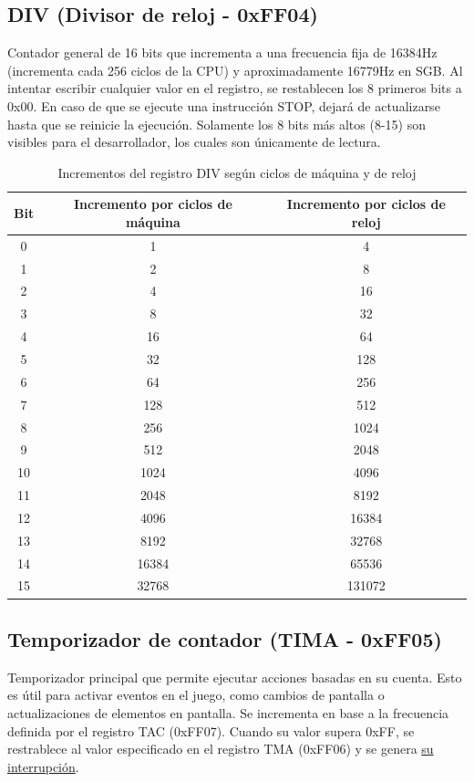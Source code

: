 \subsection{DIV (Divisor de reloj - 0xFF04)}
Contador general de 16 bits que incrementa a una frecuencia fija de 16384Hz (incrementa cada 256 ciclos de la CPU) y aproximadamente 16779Hz en SGB. Al intentar escribir cualquier valor en el registro, se restablecen los 8 primeros bits a 0x00. En caso de que se ejecute una instrucción STOP, dejará de actualizarse hasta que se reinicie la ejecución. Solamente los 8 bits más altos (8-15) son visibles para el desarrollador, los cuales son únicamente de lectura.
\begin{table}[H]
    \centering
    \begin{tabular}{|c|c|c|}
    \hline
    \textbf{Bit} & \textbf{Incremento por ciclos de máquina} & \textbf{Incremento por ciclos de reloj} \\ \hline
    0  & 1 & 4 \\ \hline
    1  & 2 & 8 \\ \hline
    2  & 4 & 16 \\ \hline
    3  & 8  & 32 \\ \hline
    4  & 16 & 64 \\ \hline
    5  & 32 & 128 \\ \hline
    6  & 64 & 256 \\ \hline
    7  & 128 & 512 \\ \hline
    8  & 256 & 1024 \\ \hline
    9  & 512 & 2048 \\ \hline
    10 & 1024 & 4096 \\ \hline
    11 & 2048 & 8192 \\ \hline
    12 & 4096 & 16384 \\ \hline
    13 & 8192 & 32768 \\ \hline
    14 & 16384 & 65536 \\ \hline
    15 & 32768 & 131072 \\ \hline
    \end{tabular}
    \caption{Incrementos del registro DIV según ciclos de máquina y de reloj}
\end{table}

\subsection{Temporizador de contador (TIMA - 0xFF05)}
Temporizador principal que permite ejecutar acciones basadas en su cuenta. Esto es útil para activar eventos en el juego, como cambios de pantalla o actualizaciones de elementos en pantalla. Se incrementa en base a la frecuencia definida por el registro TAC (0xFF07). Cuando su valor supera 0xFF, se restrablece al valor especificado en el registro TMA (0xFF06) y se genera \hyperref[interrupttype]{su interrupción}.

